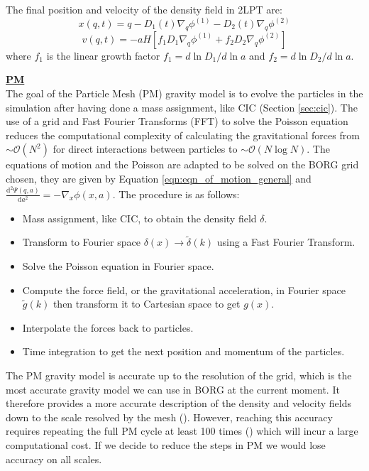 The final position and velocity of the density field in 2LPT are: 
\begin{equation}
    \boxed{x(q,t) = q - D_1(t) \nabla_q \phi^{(1)} - D_2(t) \nabla_q \phi^{(2)}}
\end{equation}
\begin{equation}
    \boxed{v(q,t) = -aH \left[ f_1 D_1 \nabla_q \phi ^{(1)} + f_2 D_2 \nabla_q \phi ^{(2)} \right]}
\end{equation}
where $f_1$ is the linear growth factor $f_1=d \ln D_1 / d \ln a$ and $f_2 = d \ln D_2 / d \ln a$. 

\noindent \textbf{\underline{PM}} \\

The goal of the Particle Mesh (PM) gravity model is to evolve the particles in the simulation after having done a mass assignment, like CIC (Section \ref{sec:cic}). 
The use of a grid and Fast Fourier Transforms (FFT) 
to solve the Poisson equation reduces the computational complexity of 
calculating the gravitational forces from $\sim\mathcal{O}(N^2)$ for direct 
interactions between particles to $\sim\mathcal{O}(N\log N)$.  
The equations of motion and the Poisson are adapted to be solved on the BORG grid chosen, they are given by Equation \ref{eqn:eqn_of_motion_general} and 
$ \frac{\text{d}^2 \Psi(q, a)}{\text{d} a^2} = - \nabla_x \phi(x, a) $. The procedure is as follows:
\begin{itemize}
    \item Mass assignment, like CIC, to obtain the density field $\delta$.
    \item Transform to Fourier space $\delta(x) \rightarrow \tilde{\delta}(k)$ using a Fast Fourier Transform.
    \item Solve the Poisson equation in Fourier space.
    \item Compute the force field, or the gravitational acceleration, in Fourier space $\tilde{g}(k)$ then transform it to Cartesian space to get $g(x)$.
    \item Interpolate the forces back to particles.
    \item Time integration to get the next position and momentum of the particles.
\end{itemize} 

The PM gravity model is accurate up to the resolution of the grid, which is the most accurate gravity model we can use in BORG at the current moment. 
It therefore 
provides a more accurate description of the density and velocity fields down 
to the scale resolved by the mesh (\cite{Feng_2016}). However, reaching this accuracy requires 
repeating the full PM cycle at least 100 times (\cite{Tassev_2013}) which will incur a large computational cost. If we decide to reduce the steps in PM we would lose accuracy on all scales.\\

